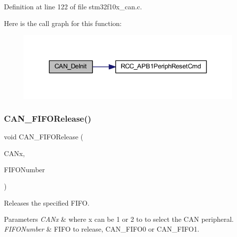 Definition at line 122 of file stm32f10x\+\_\+can.\+c.

Here is the call graph for this function\+:
\nopagebreak
\begin{figure}[H]
\begin{center}
\leavevmode
\includegraphics[width=324pt]{group___c_a_n___private___functions_ga002b74cd69574a14b17ad445090245cd_cgraph}
\end{center}
\end{figure}
\mbox{\label{group___c_a_n___private___functions_ga1bc3b39471e579b4101624c33d27918b}} 
\subsubsection{\texorpdfstring{C\+A\+N\+\_\+\+F\+I\+F\+O\+Release()}{CAN\_FIFORelease()}}
{\footnotesize\ttfamily void C\+A\+N\+\_\+\+F\+I\+F\+O\+Release (\begin{DoxyParamCaption}\item[{\hyperlink{struct_c_a_n___type_def}{C\+A\+N\+\_\+\+Type\+Def} $\ast$}]{C\+A\+Nx,  }\item[{uint8\+\_\+t}]{F\+I\+F\+O\+Number }\end{DoxyParamCaption})}



Releases the specified F\+I\+FO. 


\begin{DoxyParams}{Parameters}
{\em C\+A\+Nx} & where x can be 1 or 2 to to select the C\+AN peripheral. \\
\hline
{\em F\+I\+F\+O\+Number} & F\+I\+FO to release, C\+A\+N\+\_\+\+F\+I\+F\+O0 or C\+A\+N\+\_\+\+F\+I\+F\+O1. \\
\hline
\end{DoxyParams}

